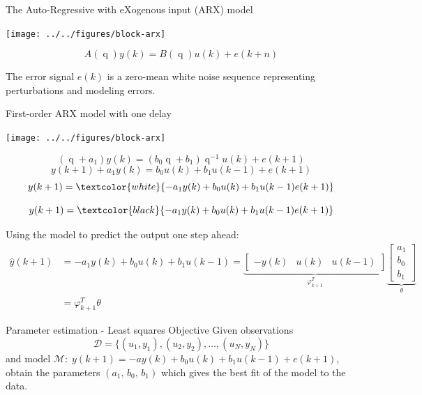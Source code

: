 \documentclass[presentation,aspectratio=169]{beamer}
\DeclareMathOperator{\shift}{q}
\begin{document}
\begin{frame}[label={sec:org0791a8d}]{The Auto-Regressive with eXogenous input (ARX) model}
\begin{center}
\texttt{[image: ../../figures/block-arx]}
\end{center}
\[ A(\shift) y(k) = B(\shift)u(k) + e(k+n) \]

The error signal \(e(k)\) is a zero-mean white noise sequence representing perturbations and modeling errors.
\end{frame}

\begin{frame}[label={sec:org98faf1f}]{First-order ARX model with one delay}
\small

\begin{center}
\texttt{[image: ../../figures/block-arx]}
\end{center}
\[ (\shift + a_1) y(k) = (b_0 \shift + b_1) \shift^{-1}u(k) + e(k+1) \]
\pause
\[ y(k+1) +  a_1y(k) = b_0u(k) + b_1u(k-1) + e(k+1) \]
\pause
\[ y(k+1) = \textcolor{white}{-a_1y(k) + b_0u(k) + b_1u(k-1) e(k+1)} \]
\pause

\[ y(k+1) = \textcolor{black}{-a_1y(k) + b_0u(k) + b_1u(k-1) e(k+1)} \]

Using the model to predict the output one step ahead:
\begin{align*}
 \hat{y}(k+1) &= -a_1y(k) + b_0u(k) + b_1u(k-1) =  \underbrace{\begin{bmatrix} -y(k) & u(k) & u(k-1) \end{bmatrix}}_{\varphi_{k+1}^T} \underbrace{\begin{bmatrix} a_1\\b_0\\b_1\end{bmatrix}}_{\theta}\\
 &= \varphi_{k+1}^T\theta
 \end{align*}
\end{frame}



\begin{frame}[label={sec:org373308d}]{Parameter estimation - Least squares}
\alert{Objective} Given observations \[\mathcal{D} = \{ (u_1,y_1), (u_2, y_2), \ldots, (u_N, y_N)\}\] and model \(\mathcal{M}: \; y(k+1) = -ay(k) + b_0u(k) + b_1u(k-1)  + e(k+1)\), obtain the parameters \((a_1,\,b_0,\,b_1)\) which gives the best fit of the model to the data.
\end{frame}
\end{document}
